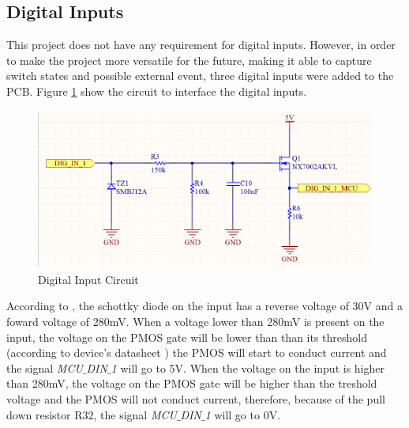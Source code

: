 	\subsection{Digital Inputs}\label{ssec:digital-inputs}

		This project does not have any requirement for digital inputs. However, in order to make the project more versatile for the future, making it able to capture switch states and possible external event, three digital inputs were added to the PCB. Figure \ref{fig:digital-input-circuit} show the circuit to interface the digital inputs.

			\begin{figure}[htbp]
				\centering
				\includegraphics[width=.8\textwidth]{figuras/fig-digital-input-circuit}
				\caption{Digital Input Circuit}
				\label{fig:digital-input-circuit}
			\end{figure}

		According to \cite{RB751V40T1-datasheet}, the schottky diode on the input has a reverse voltage of 30V and a foward voltage of 280mV. When a voltage lower than 280mV is present on the input, the voltage on the PMOS gate will be lower than than its threshold (according to device's datasheet \cite{RU1C002ZP-datasheet}) the PMOS will start to conduct current and the signal \textit{MCU$\_$DIN$\_$1} will go to 5V. When the voltage on the input is higher than 280mV, the voltage on the PMOS gate will be higher than the treshold voltage and the PMOS will not conduct current, therefore, because of the pull down resistor R32, the signal \textit{MCU$\_$DIN$\_$1} will go to 0V.